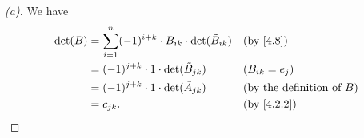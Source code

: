 \begin{proof}[(a)]
  We have
  \begin{align*}
    \det(B) & = \sum_{i = 1}^n (-1)^{i + k} \cdot B_{i k} \cdot \det(\tilde{B}_{i k}) &  & \text{(by \cref{4.8})}              \\
            & = (-1)^{j + k} \cdot 1 \cdot \det(\tilde{B}_{j k})                      &  & (B_{i k} = e_j)                     \\
            & = (-1)^{j + k} \cdot 1 \cdot \det(\tilde{A}_{j k})                      &  & \text{(by the definition of \(B\))} \\
            & = c_{j k}.                                                              &  & \text{(by \cref{4.2.2})}
  \end{align*}
\end{proof}

